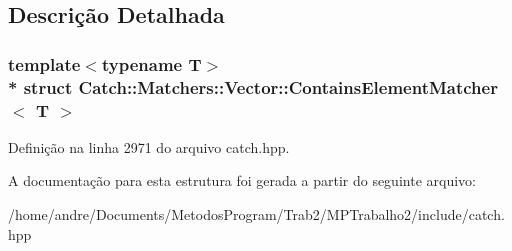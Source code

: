 \subsection{Descrição Detalhada}
\subsubsection*{template$<$typename T$>$\\*
struct Catch\+::\+Matchers\+::\+Vector\+::\+Contains\+Element\+Matcher$<$ T $>$}



Definição na linha 2971 do arquivo catch.\+hpp.



A documentação para esta estrutura foi gerada a partir do seguinte arquivo\+:\begin{DoxyCompactItemize}
\item 
/home/andre/\+Documents/\+Metodos\+Program/\+Trab2/\+M\+P\+Trabalho2/include/catch.\+hpp\end{DoxyCompactItemize}
